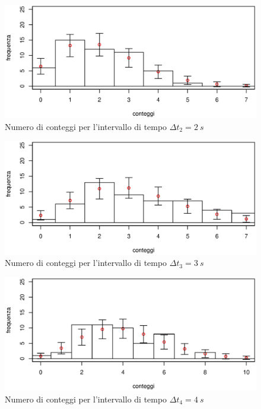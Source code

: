 \documentclass[10pt,oneside,a4paper]{article}
\begin{document}
\begin{figure}[H]
\caption{Numero di conteggi per l'intervallo di tempo $\Delta t_2 = \SI{2}{s}$}
\label{fig:istogramma_deltat2}
\centering
\includegraphics[scale=0.7]{ist_due_nuovo.eps}
\end{figure}

\begin{figure}[H]
\caption{Numero di conteggi per l'intervallo di tempo $\Delta t_3 = \SI{3}{s}$}
\label{fig:istogramma_deltat3}
\centering
\includegraphics[scale=0.7]{ist_tre_nuovo.eps}
\end{figure}

\begin{figure}[H]
\caption{Numero di conteggi per l'intervallo di tempo $\Delta t_4 = \SI{4}{s}$}
\label{fig:istogramma_deltat4}
\centering
\includegraphics[scale=0.7]{Ist_quattro_nuovo.eps}
\end{figure}
\end{document}
